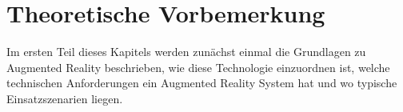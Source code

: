 \chapter{Theoretische Vorbemerkung}

Im ersten Teil dieses Kapitels werden zunächst einmal die Grundlagen zu Augmented Reality beschrieben, wie diese Technologie einzuordnen ist, welche technischen Anforderungen ein Augmented Reality System hat und wo typische Einsatzszenarien liegen.\\






